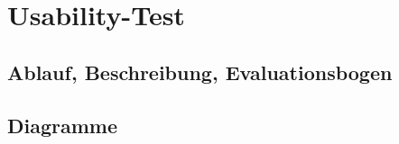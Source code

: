 \section{Usability-Test} 
\label{app:Usability}
\subsection{Ablauf, Beschreibung, Evaluationsbogen}

\newpage
\subsection{Diagramme}
\label{app:UsabilityKreisdiagramme}
